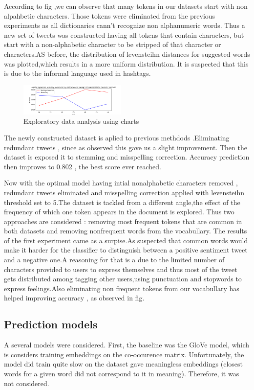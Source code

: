 \documentclass[10pt,conference,compsocconf]{IEEEtran}
\begin{document}
According to fig ,we can observe that many tokens in our datasets start with non alpahbetic characters. Those tokens were eliminated from the previous experiments as all dictionaries cann't recognize non alphanumeric words. Thus  a new set of tweets was constructed having all tokens that contain characters, but start with a non-alphabetic character to be stripped of that character or characters.AS before, the distribution of levensteihn distances for suggested words was plotted,which results in a more uniform distribution. It is suspected that this is due to the informal language used in hashtags. 
\begin{figure}[!htb]
	\centering \includegraphics[width=200px]{../plots/filtered_text.png}
	\caption{Exploratory data analysis using charts}
	\label{fig:data}
\end{figure}
The newly constructed dataset is aplied to previous methdods .Eliminating redundant tweets , since as observed this gave us a slight improvement. Then the dataset is exposed it to stemming and misspelling correction. Accuracy prediction then improves to 0.802 , the best score ever reached.

Now with the optimal model having intial nonalphabetic characters removed , redundant tweets eliminated and misspelling correction applied with levensteihn threshold set to 5.The dataset is tackled from a different angle,the effect of the frequency of which one token appears in the document is explored. Thus two approaches are considered : removing most frequent tokens that are common in both datasets and removing nonfrequent words from the vocabullary. The results of the first experiment came as a surpise.As suspected that common words would make it harder for the classifier to distinguish between a positive sentiment tweet and a negative one.A reasoning for that is a due to the limited number of characters provided to users to express themselves and thus most of the tweet gets distributed among tagging other users,using punctuation and stopwords to express feelings.Also eliminating non frequent tokens from our vocabullary has helped improving accuracy , as observed in fig.

\subsection{Prediction models}
A several models were considered.
First, the baseline was the GloVe \cite{glove} model, which is considers training embeddings on the co-occurence matrix.
Unfortunately, the model did train quite slow on the dataset gave meaningless embeddings (closest words for a given word did not correspond to it in meaning).
Therefore, it was not considered.
\end{document}

